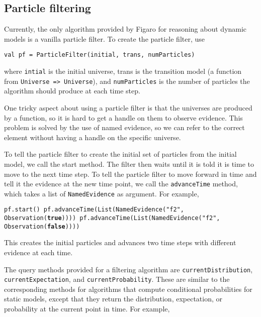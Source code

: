 \subsection{Particle filtering}

Currently, the only algorithm provided by Figaro for reasoning about dynamic models is a vanilla particle filter. To create the particle filter, use

\begin{flushleft}
\texttt{val pf = ParticleFilter(initial, trans, numParticles)}
\end{flushleft}

where \texttt{intial} is the initial universe, trans is the transition model (a function from \texttt{Universe => Universe}), and \texttt{numParticles} is the number of particles the algorithm should produce at each time step.

One tricky aspect about using a particle filter is that the universes are produced by a function, so it is hard to get a handle on them to observe evidence. This problem is solved by the use of named evidence, so we can refer to the correct element without having a handle on the specific universe.

To tell the particle filter to create the initial set of particles from the initial model, we call the start method. The filter then waits until it is told it is time to move to the next time step. To tell the particle
filter to move forward in time and tell it the evidence at the new time point, we call the \texttt{advanceTime} method, which takes a list of \texttt{NamedEvidence} as argument. For example,
 
\begin{flushleft}
\texttt{pf.start()
\newline pf.advanceTime(List(NamedEvidence("f2", Observation(\textbf{true}))))
\newline pf.advanceTime(List(NamedEvidence("f2", Observation(\textbf{false}))))}
\end{flushleft}

This creates the initial particles and advances two time steps with different evidence at each time. 

The query methods provided for a filtering algorithm are \texttt{currentDi\-stribution},
\texttt{currentExpectation}, and \texttt{currentProbability}. These are similar to the corresponding methods for algorithms that compute conditional probabilities for static models, except that they return the distribution, expectation, or probability at the current point in time. For example,

